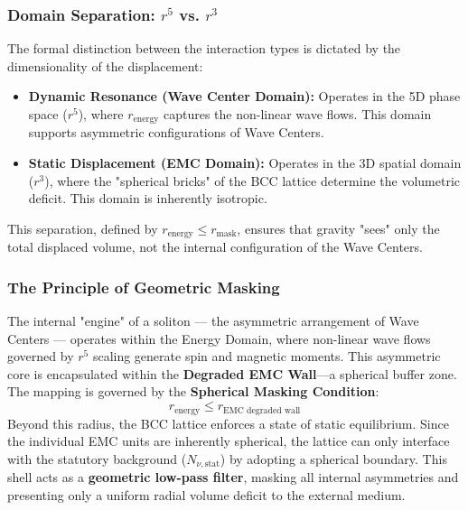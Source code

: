\documentclass[10pt,a4paper]{article}
\begin{document}
\subsubsection{Domain Separation: $r^5$ vs. $r^3$}
The formal distinction between the interaction types is dictated by the dimensionality of the displacement:
\begin{itemize}
	\item \textbf{Dynamic Resonance (Wave Center Domain):} Operates in the 5D phase space ($r^5$), where $r_{\text{energy}}$ captures the non-linear wave flows. This domain supports asymmetric configurations of Wave Centers.
	\item \textbf{Static Displacement (EMC Domain):} Operates in the 3D spatial domain ($r^3$), where the "spherical bricks" of the BCC lattice determine the volumetric deficit. This domain is inherently isotropic.
\end{itemize}

This separation, defined by $r_{\text{energy}} \le r_{\text{mask}}$, ensures that gravity "sees" only the total displaced volume, not the internal configuration of the Wave Centers.

\subsubsection{The Principle of Geometric Masking}
The internal "engine" of a soliton — the asymmetric arrangement of Wave Centers — operates within the Energy Domain, where non-linear wave flows governed by $r^5$ scaling generate spin and magnetic moments. This asymmetric core is encapsulated within the \textbf{Degraded EMC Wall}—a spherical buffer zone. The mapping is governed by the \textbf{Spherical Masking Condition}:
\begin{equation}
	r_{\text{energy}} \le r_{\text{EMC degraded wall}}
\end{equation}
Beyond this radius, the BCC lattice enforces a state of static equilibrium. Since the individual EMC units are inherently spherical, the lattice can only interface with the statutory background ($N_{\nu, \text{stat}}$) by adopting a spherical boundary. This shell acts as a \textbf{geometric low-pass filter}, masking all internal asymmetries and presenting only a uniform radial volume deficit to the external medium.
\end{document}

